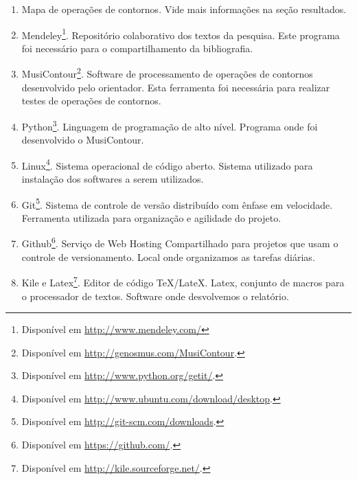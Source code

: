 \documentclass[11pt]{article}
\begin{document}
\begin{enumerate}
\item Mapa de operações de contornos. Vide mais
  informações na seção resultados.
\item Mendeley\footnote{Disponível em
    \url{http://www.mendeley.com/}}. Repositório colaborativo dos
  textos da pesquisa. Este programa foi necessário para o
  compartilhamento da bibliografia.
\item MusiContour\footnote{Disponível em
    \url{http://genosmus.com/MusiContour}.}. Software de processamento
  de operações de contornos desenvolvido pelo orientador. Esta
  ferramenta foi necessária para realizar testes de operações de
  contornos.
\item Python\footnote{Disponível em
  \url{http://www.python.org/getit/}.}. Linguagem de programação de
  alto nível. Programa onde foi desenvolvido o MusiContour.
\item Linux\footnote{Disponível em
  \url{http://www.ubuntu.com/download/desktop}.}. Sistema operacional
  de código aberto. Sistema utilizado para instalação dos softwares a
  serem utilizados.
\item Git\footnote{Disponível em
  \url{http://git-scm.com/downloads}.}. Sistema de controle de versão
distribuído com ênfase em velocidade. Ferramenta utilizada para organização
e agilidade do projeto.
\item Github\footnote{Disponível em
  \url{https://github.com/}.}. Serviço de Web Hosting Compartilhado
para projetos que usam o controle de versionamento. Local onde organizamos
as tarefas diárias.
\item Kile e Latex\footnote{Disponível em
  \url{http://kile.sourceforge.net/}.}. Editor de código
TeX/LateX. Latex, conjunto de macros para o processador de textos. Software
onde desvolvemos o relatório.
\end{enumerate}
\end{document}
